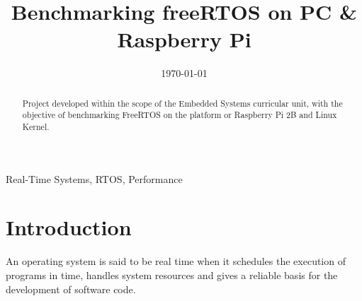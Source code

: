 \documentclass[conference]{IEEEtran}
\date{\today}
\begin{document}
\title{Benchmarking freeRTOS on PC \& Raspberry Pi}

\author{
\and
}

\maketitle


\begin{abstract}
Project developed within the scope of the Embedded Systems curricular unit, with the objective of benchmarking FreeRTOS on the platform or Raspberry Pi 2B and Linux Kernel.

\end{abstract}

\begin{IEEEkeywords}
Real-Time Systems, RTOS, Performance
\end{IEEEkeywords}

\section{Introduction}

An operating system is said to be real time when it
schedules the execution of programs in time, handles system
resources and gives a reliable basis for the development of
software code. \cite{b1}
\end{document}
